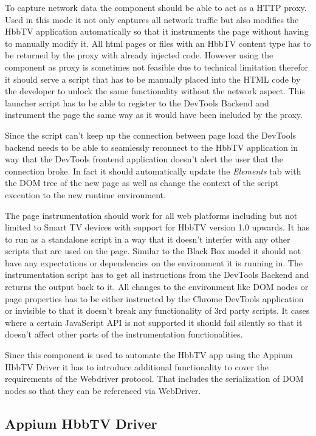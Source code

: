 To capture network data the component should be able to act as a HTTP proxy. Used in this
mode it not only captures all network traffic but also modifies the HbbTV application
automatically so that it instruments the page without having to manually modify it. All
html pages or files with an HbbTV content type has to be returned by the proxy with already
injected code. However using the component as proxy is sometimes not feasible due to technical
limitation therefor it should serve a script that has to be manually placed into the HTML code
by the developer to unlock the same functionality without the network aspect. This launcher
script has to be able to register to the DevTools Backend and instrument the page the same way
as it would have been included by the proxy.

Since the script can't keep up the connection between page load the DevTools backend needs to
be able to seamlessly reconnect to the HbbTV application in way that the DevTools frontend
application doesn't alert the user that the connection broke. In fact it should automatically
update the \textit{Elements} tab with the DOM tree of the new page as well as change the context
of the script execution to the new runtime environment.

The page instrumentation should work for all web platforms including but not limited to Smart TV
devices with support for HbbTV version 1.0 upwards. It has to run as a standalone script in
a way that it doesn't interfer with any other scripts that are used on the page. Similar to the
Black Box model it should not have any expectations or dependencies on the environment it is
running in. The instrumentation script has to get all instructions from the DevTools Backend and
returns the output back to it. All changes to the environment like DOM nodes or page properties
has to be either instructed by the Chrome DevTools application or invisible to that it doesn't
break any functionality of 3rd party scripts. It cases where a certain JavaScript API is not
supported it should fail silently so that it doesn't affect other parts of the instrumentation
functionalities.

Since this component is used to automate the HbbTV app using the Appium HbbTV Driver it has to
introduce additional functionality to cover the requirements of the Webdriver protocol. That
includes the serialization of DOM nodes so that they can be referenced via WebDriver.

\subsection{Appium HbbTV Driver}

